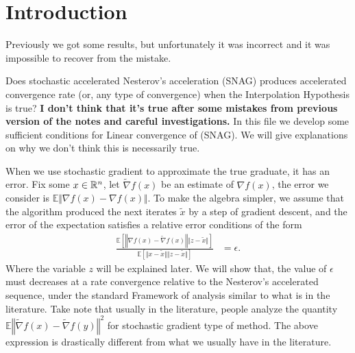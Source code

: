 \documentclass[12pt]{article}
\newcommand{\expect}{\ensuremath{\mathbb E}}
\begin{document}
\section{Introduction}
    \cite{bauschke_convex_2017}
    Previously we got some results, but unfortunately it was incorrect and it was impossible to recover from the mistake. 
    \par
    Does stochastic accelerated Nesterov's acceleration (SNAG) produces accelerated convergence rate (or, any type of convergence) when the Interpolation Hypothesis is true? 
    \textbf{I don't think that it's true after some mistakes from previous version of the notes and careful investigations.}
    In this file we develop some sufficient conditions for Linear convergence of (SNAG). 
    We will give explanations on why we don't think this is necessarily true. 
    \par
    When we use stochastic gradient to approximate the true graduate, it has an error. 
    Fix some $x\in \mathbb R^n$, let $\tilde \nabla f(x)$ be an estimate of $\nabla f(x)$, the error we consider is $\expect \Vert \nabla f(x) - \nabla f(x)\Vert$. 
    To make the algebra simpler, we assume that the algorithm produced the next iterates $\tilde x$ by a step of gradient descent, and the error of the expectation satisfies a relative error conditions of the form 
    \begin{align*}
        \frac{
            \expect \left[
                \left\Vert \nabla f(x) - \tilde \nabla f(x) \right\Vert \Vert z - \tilde x\Vert
            \right]
            }{
            \expect \left[
                \Vert x - \tilde x\Vert\Vert z - \tilde x\Vert
            \right]
            } &= \epsilon. 
    \end{align*}
    Where the variable $z$ will be explained later. 
    We will show that, the value of $\epsilon$ must decreases at a rate convergence relative to the Nesterov's accelerated sequence, under the standard Framework of analysis similar to what is in the literature. 
    Take note that usually in the literature, people analyze the quantity $\expect\left\Vert \tilde \nabla f(x) - \tilde \nabla f(y)\right\Vert^2$ for stochastic gradient type  of method. 
    The above expression is drastically different from what we usually have in the literature. 
\end{document}
